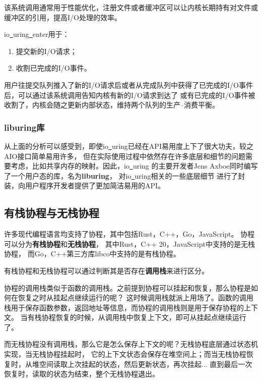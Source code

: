 \documentclass[supercite]{HustGraduPaper}
\theoremstyle{definition}
\begin{document}
该系统调用通常用于性能优化，注册文件或者缓冲区可以让内核长期持有对文件或缓冲区的引用，提高I/O处理的效率。\par

io\underline{~}uring\underline{~}enter用于：
\begin{enumerate}[label={(\arabic*)}]
  \item 提交新的I/O请求；
  \item 收割已完成的I/O事件。
\end{enumerate}

用户往提交队列推入了新的I/O请求后或者从完成队列中获得了已完成的I/O事件后，可以通过该系统调用告知内核有新的I/O请求到达了
或有已完成的I/O事件被收割了，内核会随之更新内部状态，维持两个队列的生产--消费平衡。\par

\subsubsection{liburing库}
从上面的分析可以感受到，即使io\underline{~}uring已经在API易用度上下了很大功夫，较之AIO接口简单易用许多，
但在实际使用过程中依然存在许多底层和细节的问题需要考虑，比如共享内存的映射。因此，io\underline{~}uring
的主要开发者Jens Axboe同时编写了一个用户态的库，名为\textbf{liburing}\cite{liburing.org}，
对io\underline{~}uring相关的一些底层细节
进行了封装，向用户程序开发者提供了更加简洁易用的API。\par

\subsection{有栈协程与无栈协程}
许多现代编程语言均支持了协程，其中包括Rust，C++，Go，JavaScript。
协程可以分为\textbf{有栈协程}和\textbf{无栈协程}\cite{weber2022closer}，
其中Rust，C++ 20，JavaScript中支持的是无栈协程，
而Go，C++第三方库libco中支持的是有栈协程。\par

有栈协程和无栈协程可以通过判断其是否存在\textbf{调用栈}来进行区分。\par

协程的调用栈类似于函数的调用栈。之前提到协程可以挂起和恢复，那么协程是如何在恢复之时从挂起点继续运行的呢？
这时候调用栈就派上用场了。函数的调用栈用于保存函数参数，返回地址等信息，而协程的调用栈则是用于保存协程的上下文。
当有栈协程恢复的时候，从调用栈中恢复上下文，即可从挂起点继续运行了。\par

而无栈协程没有调用栈，那么它是怎么保存上下文的呢？无栈协程底层通过状态机实现，当无栈协程挂起时，
它的上下文状态会保存在堆空间上；而当无栈协程恢复时，从堆空间读取上次挂起的状态，然后更新状态，再次挂起...
直到最后一次恢复时，读取的状态为结束，整个无栈协程退出。\par
\end{document}
